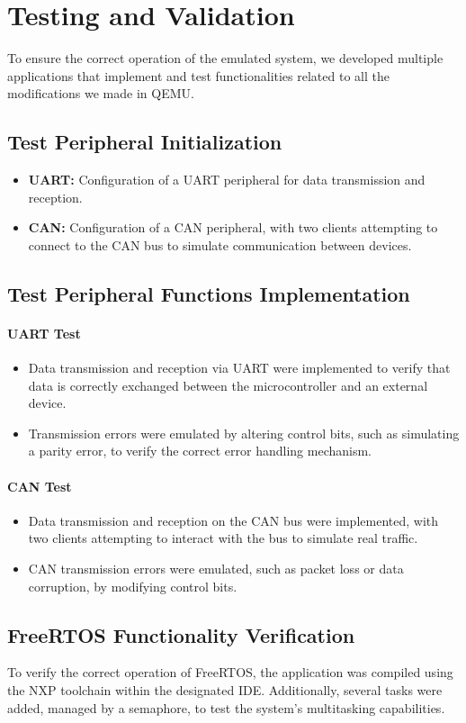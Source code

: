 \section{Testing and Validation}
To ensure the correct operation of the emulated system, we developed multiple applications that implement and test functionalities related to all the modifications we made in QEMU.


\subsection{Test Peripheral Initialization}

\begin{itemize}
    \item \textbf{UART:} Configuration of a UART peripheral for data transmission and reception.
    \item \textbf{CAN:} Configuration of a CAN peripheral, with two clients attempting to connect to the CAN bus to simulate communication between devices.
\end{itemize}


\subsection{Test Peripheral Functions Implementation}

\paragraph{UART Test}

\begin{itemize}
    \item Data transmission and reception via UART were implemented to verify that data is correctly exchanged between the microcontroller and an external device.
    \item Transmission errors were emulated by altering control bits, such as simulating a parity error, to verify the correct error handling mechanism.
\end{itemize}

\paragraph{CAN Test}

\begin{itemize}
    \item Data transmission and reception on the CAN bus were implemented, with two clients attempting to interact with the bus to simulate real traffic.
    \item CAN transmission errors were emulated, such as packet loss or data corruption, by modifying control bits.
\end{itemize}


\subsection{FreeRTOS Functionality Verification}
To verify the correct operation of FreeRTOS, the application was compiled using the NXP toolchain within the designated IDE. Additionally, several tasks were added, managed by a semaphore, to test the system's multitasking capabilities.

